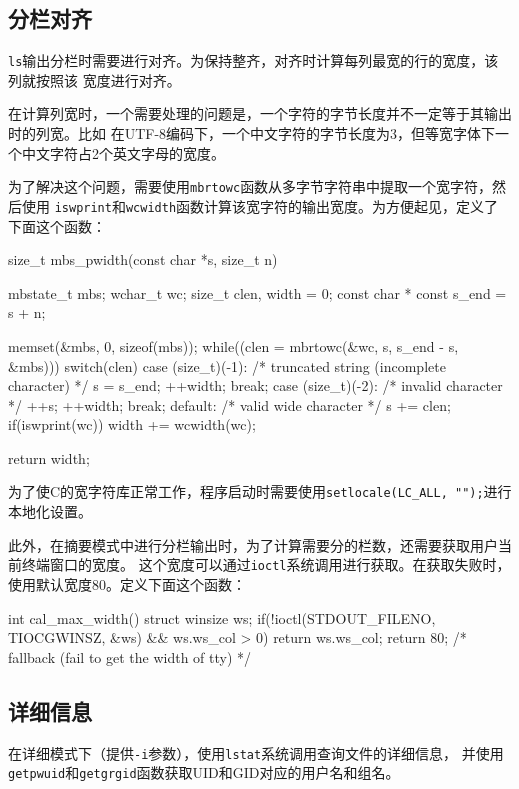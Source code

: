 \documentclass[a4paper, adobefonts]{ctexart}
\begin{document}
\subsection{分栏对齐}
\label{sub:fen_lan_dui_qi_}
\verb|ls|输出分栏时需要进行对齐。为保持整齐，对齐时计算每列最宽的行的宽度，该列就按照该
宽度进行对齐。

在计算列宽时，一个需要处理的问题是，一个字符的字节长度并不一定等于其输出时的列宽。比如
在UTF-8编码下，一个中文字符的字节长度为3，但等宽字体下一个中文字符占2个英文字母的宽度。

为了解决这个问题，需要使用\verb|mbrtowc|函数从多字节字符串中提取一个宽字符，然后使用
\verb|iswprint|和\verb|wcwidth|函数计算该宽字符的输出宽度。为方便起见，定义了下面这个函数：

\begin{ccode}
size_t mbs_pwidth(const char *s, size_t n)
{
    mbstate_t mbs;
    wchar_t wc;
    size_t clen, width = 0;
    const char * const s_end = s + n;

    memset(&mbs, 0, sizeof(mbs));
    while((clen = mbrtowc(&wc, s, s_end - s, &mbs))) {
        switch(clen) {
            case (size_t)(-1):  /* truncated string (incomplete character) */
                s = s_end;
                ++width;
                break;
            case (size_t)(-2):  /* invalid character */
                ++s;
                ++width;
                break;
            default:  /* valid wide character */
                s += clen;
                if(iswprint(wc))
                    width += wcwidth(wc);
        }
    }

    return width;
}
\end{ccode}

为了使C的宽字符库正常工作，程序启动时需要使用\verb|setlocale(LC_ALL, "");|进行本地化设置。

此外，在摘要模式中进行分栏输出时，为了计算需要分的栏数，还需要获取用户当前终端窗口的宽度。
这个宽度可以通过\verb|ioctl|系统调用进行获取。在获取失败时，使用默认宽度80。定义下面这个函数：

\begin{ccode}
int cal_max_width()
{
    struct winsize ws;
    if(!ioctl(STDOUT_FILENO, TIOCGWINSZ, &ws) && ws.ws_col > 0)
        return ws.ws_col;
    return 80;  /* fallback (fail to get the width of tty) */
}
\end{ccode}

\subsection{详细信息}
\label{sub:xiang_xi_xin_xi_}
在详细模式下（提供\verb|-i|参数），使用\verb|lstat|系统调用查询文件的详细信息，
并使用\verb|getpwuid|和\verb|getgrgid|函数获取UID和GID对应的用户名和组名。
\end{document}
